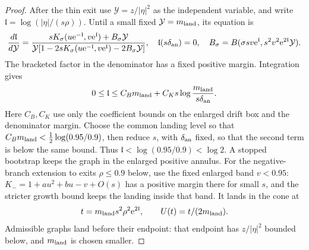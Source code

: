\begin{proof}
After the thin exit use \(\mathcal Y=z/|\eta|^2\) as the independent variable,
and write \(\mathfrak l=\log(|\eta|/(s\rho))\).
Until a small fixed \(\mathcal Y=m_{\rm land}\), its equation is
\begin{equation}
\label{eq:direct-annulus-landing-clock}
 \frac{d\mathfrak l}{d\mathcal Y}
 =\frac{sK_\sigma(u\mathrm e^{-\mathfrak l},v\mathrm e^{\mathfrak l})+B_\sigma \mathcal Y}
        {\mathcal Y[1-2sK_\sigma(u\mathrm e^{-\mathfrak l},v\mathrm e^{\mathfrak l})-2B_\sigma \mathcal Y]},
 \quad \mathfrak l(s\delta_{\rm an})=0,\quad
 B_\sigma=B(\sigma sv\mathrm e^{\mathfrak l},s^2v^2\mathrm e^{2\mathfrak l}\mathcal Y).
\end{equation}
The bracketed factor in the denominator has a fixed positive margin.
Integration gives
\[
 0\le\mathfrak l\le C_Bm_{\rm land}
      +C_Ks\log\frac{m_{\rm land}}{s\delta_{\rm an}}.
\]
Here \(C_B,C_K\) use only the coefficient bounds on the enlarged
drift box and the denominator margin. Choose the common landing level
so that \(C_Bm_{\rm land}<\tfrac12\log(0.95/0.9)\), then reduce
\(s\), with \(\delta_{\rm an}\) fixed, so that the second term is
below the same bound. Thus \(\mathfrak l<\log(0.95/0.9)<\log2\).
A stopped bootstrap keeps the graph in the enlarged positive annulus.
For the negative-branch extension to exits \(\rho\le0.9\) below,
use the fixed enlarged band \(v<0.95\):
\(K_-=1+au^2+bu-v+O(s)\) has a positive margin there for small
\(s\), and the stricter growth bound keeps the landing inside that
band. It lands in the
cone at
\[
 t=m_{\rm land}s^2\rho^2\mathrm e^{2\mathfrak l},\qquad U(t)=t/(2m_{\rm land}).
\]
Admissible graphs land before their endpoint: that endpoint has
\(z/|\eta|^2\) bounded below, and \(m_{\rm land}\) is chosen smaller.


\end{proof}
